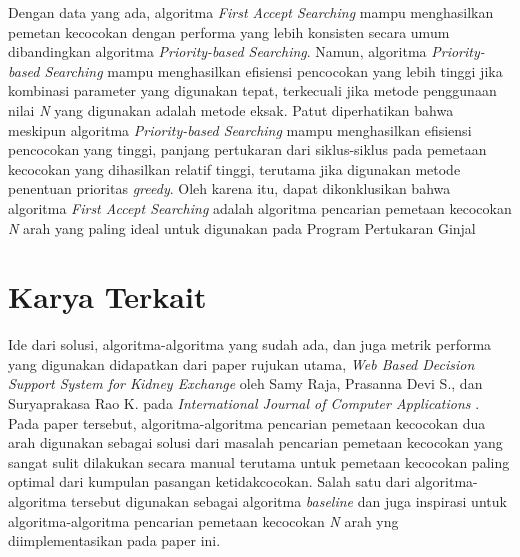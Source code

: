 \documentclass[conference]{IEEEtran}
\begin{document}
Dengan data yang ada, algoritma \textit{First Accept Searching} mampu menghasilkan pemetan kecocokan dengan performa yang lebih konsisten
secara umum dibandingkan algoritma \textit{Priority-based Searching}. Namun, algoritma \textit{Priority-based Searching} mampu menghasilkan
efisiensi pencocokan yang lebih tinggi jika kombinasi parameter yang digunakan tepat, terkecuali jika metode penggunaan nilai \textit{N} yang digunakan
adalah metode eksak. Patut diperhatikan bahwa meskipun algoritma \textit{Priority-based Searching} mampu menghasilkan efisiensi pencocokan
yang tinggi, panjang pertukaran dari siklus-siklus pada pemetaan kecocokan yang dihasilkan relatif tinggi, terutama jika digunakan metode
penentuan prioritas \textit{greedy}. Oleh karena itu, dapat dikonklusikan bahwa algoritma \textit{First Accept Searching} adalah algoritma
pencarian pemetaan kecocokan \textit{N} arah yang paling ideal untuk digunakan pada Program Pertukaran Ginjal

\section{Karya Terkait}
Ide dari solusi, algoritma-algoritma yang sudah ada, dan juga metrik performa yang digunakan didapatkan dari paper rujukan utama,
\textit{Web Based Decision Support System for Kidney Exchange} oleh Samy Raja, Prasanna Devi S., dan Suryaprakasa Rao K. pada
\textit{International Journal of Computer Applications} \cite{raja}. Pada paper tersebut, algoritma-algoritma pencarian pemetaan
kecocokan dua arah digunakan sebagai solusi dari masalah pencarian pemetaan kecocokan yang sangat sulit dilakukan secara manual
terutama untuk pemetaan kecocokan paling optimal dari kumpulan pasangan ketidakcocokan. Salah satu dari algoritma-algoritma tersebut
digunakan sebagai algoritma \textit{baseline} dan juga inspirasi untuk algoritma-algoritma pencarian pemetaan kecocokan \textit{N}
arah yng diimplementasikan pada paper ini.
\end{document}
